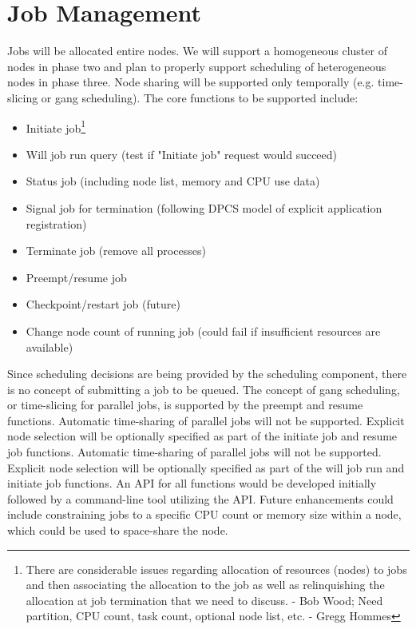 \section{Job Management}

Jobs will be allocated entire nodes. We will support a homogeneous cluster of
nodes in phase two and plan to properly support scheduling of heterogeneous
nodes in phase three. Node sharing will be supported only temporally (e.g.
time-slicing or  gang scheduling). The core functions to be supported include:
\begin{itemize}
\item Initiate job\footnote{There are considerable issues regarding allocation 
of resources (nodes) to jobs and then associating the  allocation to the job 
as well as relinquishing the allocation at job termination that we need to 
discuss. - Bob Wood; Need partition, CPU count, task count, optional node 
list, etc.  - Gregg Hommes}
\item Will job run query (test if "Initiate job" request would succeed)
\item Status job (including node list, memory and CPU use data)
\item Signal job for termination (following DPCS model of explicit application
registration)
\item Terminate job (remove all processes)
\item Preempt/resume job 
\item Checkpoint/restart job (future)
\item Change node count of running job (could fail if insufficient resources are available)
\end{itemize}

Since scheduling decisions are being provided by the scheduling component,
there is no concept of submitting a job to be queued. The concept of gang
scheduling, or time-slicing for parallel jobs, is supported by the preempt and
resume functions. Automatic time-sharing of parallel jobs will not be
supported. Explicit node selection will be optionally specified as part 
of the initiate job and resume job functions. Automatic time-sharing of 
parallel jobs will not be
supported. Explicit node selection will be optionally specified as part of the
will job run and initiate job functions. An API for all functions would be
developed initially followed by a  command-line tool utilizing the API. Future
enhancements could include constraining jobs to a specific CPU count or memory
size within a node, which could be used to space-share the node.

